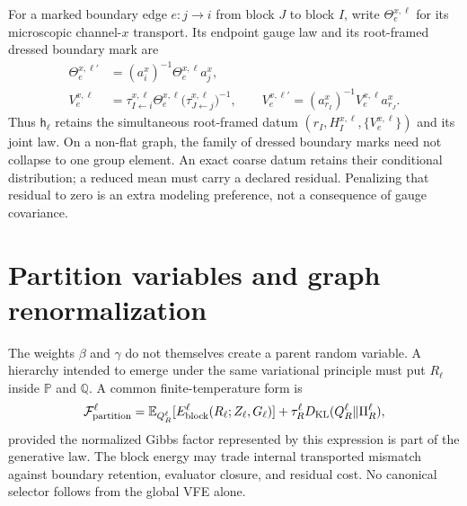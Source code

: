For a marked boundary edge $e:j\to i$ from block $J$ to block $I$, write
$\Theta_e^{x,\ell}$ for its microscopic channel-$x$ transport. Its endpoint
gauge law and its root-framed dressed boundary mark are
\begin{align}
\Theta_e^{x,\ell\prime}
&=(a_i^x)^{-1}\Theta_e^{x,\ell}a_j^x,
\nonumber\\
V_e^{x,\ell}
&=\tau_{I\leftarrow i}^{x,\ell}\Theta_e^{x,\ell}
\bigl(\tau_{J\leftarrow j}^{x,\ell}\bigr)^{-1},
\qquad
V_e^{x,\ell\prime}
=(a_{r_I}^x)^{-1}V_e^{x,\ell}a_{r_J}^x.
\label{eq:full-graph-dressed-edge}
\end{align}
Thus $\mathsf h_\ell$ retains the simultaneous root-framed datum
$(r_I,H_I^{x,\ell},\{V_e^{x,\ell}\})$ and its joint law. On a non-flat graph,
the family of dressed boundary marks need not collapse to one group element.
An exact coarse datum retains their conditional distribution; a reduced mean
must carry a declared residual. Penalizing that residual to zero is an extra
modeling preference, not a consequence of gauge covariance. 

\section{Partition variables and graph renormalization}
\label{sec:full-graph-vfe-partitions}

The weights $\beta$ and $\gamma$ do not themselves create a parent random
variable. A hierarchy intended to emerge under the same variational principle
must put $R_\ell$ inside $\mathbb P$ and $\mathbb Q$. A common finite-temperature
form is
\begin{equation}
\mathcal F_{\mathrm{partition}}^\ell
=\mathbb E_{Q_R^\ell}[E_{\mathrm{block}}^\ell(R_\ell;Z_\ell,G_\ell)]
+\tau_R^\ell D_{\mathrm{KL}}(Q_R^\ell\Vert\Pi_R^\ell),
\label{eq:full-graph-partition-free-energy}
\end{equation}
provided the normalized Gibbs factor represented by this expression is part
of the generative law. The block energy may trade internal transported
mismatch against boundary retention, evaluator closure, and residual cost.
No canonical selector follows from the global VFE alone. 


